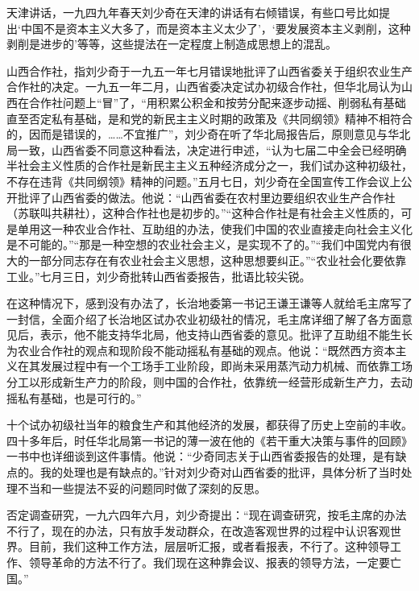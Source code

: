 \begin{maonote}
天津讲话，一九四九年春天刘少奇在天津的讲话有右倾错误，有些口号比如提出‘中国不是资本主义大多了，而是资本主义太少了’，‘要发展资本主义剥削，这种剥削是进步的’等等，这些提法在一定程度上制造成思想上的混乱。

山西合作社，指刘少奇于一九五一年七月错误地批评了山西省委关于组织农业生产合作社的决定。一九五一年二月，山西省委决定试办初级合作社，但华北局认为山西在合作社问题上“冒”了，“用积累公积金和按劳分配来逐步动摇、削弱私有基础直至否定私有基础，是和党的新民主主义时期的政策及《共同纲领》精神不相符合的，因而是错误的，……不宜推广”，刘少奇在听了华北局报告后，原则意见与华北局一致，山西省委不同意这种看法，决定进行申述，“认为七届二中全会已经明确半社会主义性质的合作社是新民主主义五种经济成分之一，我们试办这种初级社，不存在违背《共同纲领》精神的问题。”五月七日，刘少奇在全国宣传工作会议上公开批评了山西省委的做法。他说：“山西省委在农村里边要组织农业生产合作社（苏联叫共耕社），这种合作社也是初步的。”“这种合作社是有社会主义性质的，可是单用这一种农业合作社、互助组的办法，使我们中国的农业直接走向社会主义化是不可能的。”“那是一种空想的农业社会主义，是实现不了的。”“我们中国党内有很大的一部分同志存在有农业社会主义思想，这种思想要纠正。”“农业社会化要依靠工业。”七月三日，刘少奇批转山西省委报告，批语比较尖锐。

在这种情况下，感到没有办法了，长治地委第一书记王谦王谦等人就给毛主席写了一封信，全面介绍了长治地区试办农业初级社的情况，毛主席详细了解了各方面意见后，表示，他不能支持华北局，他支持山西省委的意见。批评了互助组不能生长为农业合作社的观点和现阶段不能动摇私有基础的观点。他说：“既然西方资本主义在其发展过程中有一个工场手工业阶段，即尚未采用蒸汽动力机械、而依靠工场分工以形成新生产力的阶段，则中国的合作社，依靠统一经营形成新生产力，去动摇私有基础，也是可行的。”

十个试办初级社当年的粮食生产和其他经济的发展，都获得了历史上空前的丰收。四十多年后，时任华北局第一书记的薄一波在他的《若干重大决策与事件的回顾》一书中也详细谈到这件事情。他说：“少奇同志关于山西省委报告的处理，是有缺点的。我的处理也是有缺点的。”针对刘少奇对山西省委的批评，具体分析了当时处理不当和一些提法不妥的问题同时做了深刻的反思。

否定调查研究，一九六四年六月，刘少奇提出：“现在调查研究，按毛主席的办法不行了，现在的办法，只有放手发动群众，在改造客观世界的过程中认识客观世界。目前，我们这种工作方法，层层听汇报，或者看报表，不行了。这种领导工作、领导革命的方法不行了。我们现在这种靠会议、报表的领导方法，一定要亡国。”


\end{maonote}
